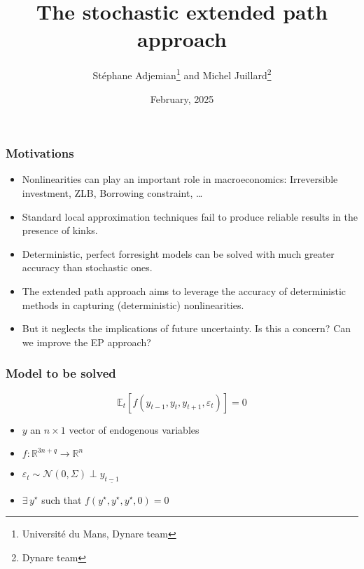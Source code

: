 \documentclass{beamer}
\begin{document}


\title{The stochastic extended path approach}
\author{St\'ephane Adjemian\footnote{Universit\'e du Mans, Dynare team} and Michel Juillard\footnote{Dynare team}}
\date{February, 2025}

\begin{frame}
  \titlepage{}
\end{frame}


\begin{frame}
  \frametitle{Motivations}

  \begin{itemize}

  \item Nonlinearities can play an important role in macroeconomics:
    Irreversible investment, ZLB, Borrowing constraint, \ldots\newline

  \item Standard local approximation techniques fail to produce
    reliable results in the presence of kinks.\newline

  \item Deterministic, perfect forresight models can be solved with much
    greater accuracy than stochastic ones.\newline

  \item The extended path approach aims to leverage the accuracy of
    deterministic methods in capturing (deterministic) nonlinearities.\newline

  \item But it neglects the implications of future uncertainty. Is
    this a concern? Can we improve the EP approach?

  \end{itemize}
\end{frame}


\begin{frame}
\frametitle{Model to be solved}

\[
\mathbb E_t\left[ f\left( y_{t-1},y_t,y_{t+1},\varepsilon_t \right) \right] = 0
\]

\bigskip

\begin{itemize}

\item $y$ an $n\times 1$ vector of endogenous variables\newline

\item $f: \mathbb R^{3n+q}\rightarrow \mathbb R^n$\newline

\item $\varepsilon_t \sim \mathcal N\left( 0,\Sigma \right) \perp y_{\underline{t-1}}$\newline

\item $ \exists\, y^{\star}$ such that $f\left( y^{\star},y^{\star},y^{\star},0 \right)=0$

\end{itemize}

\end{frame}
\end{document}
